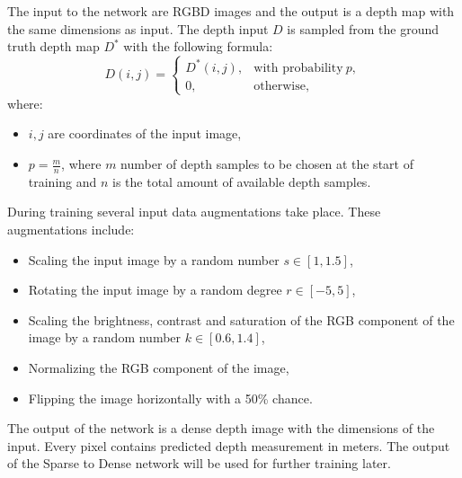\documentclass[twoside]{ctuthesis}
\theoremstyle{plain}
\theoremstyle{definition}
\theoremstyle{note}
\begin{document}
The input to the network are RGBD images and the output is a depth map with the same dimensions as input. The depth input $D$ is sampled from the ground truth depth map $D^*$ with the following formula:
\begin{equation}
	D(i,j)=\begin{cases}
		D^*(i,j),&\text{with probability}\ p,\\
		0,&\text{otherwise},
	\end{cases}
\end{equation}
where:
\begin{itemize}
	\item $i,j$ are coordinates of the input image,
	\item $p=\frac{m}{n}$, where $m$ number of depth samples to be chosen at the start of training and $n$ is the total amount of available depth samples.
\end{itemize}
During training several input data augmentations take place. These augmentations include:
\begin{itemize}
	\item Scaling the input image by a random number $s\in[1,1.5]$,
	\item Rotating the input image by a random degree $r\in[-5,5]$,
	\item Scaling the brightness, contrast and saturation of the RGB component of the image by a random number $k\in[0.6,1.4]$,
	\item Normalizing the RGB component of the image,
	\item Flipping the image horizontally with a 50\% chance.
\end{itemize}
The output of the network is a dense depth image with the dimensions of the input. Every pixel contains predicted depth measurement in meters. The output of the Sparse to Dense network will be used for further training later.
\end{document}
